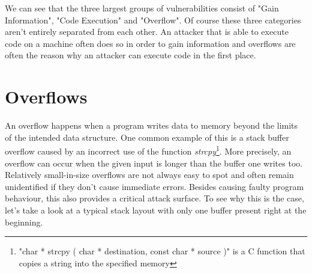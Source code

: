 \documentclass[10pt,twocolumn,a4paper]{article}
\begin{document}
We can see that the three largest groups of vulnerabilities consist of "Gain Information", "Code Execution" and "Overflow".
Of course these three categories aren't entirely separated from each other.
An attacker that is able to execute code on a machine often does so in order to gain information and overflows are often the reason why an attacker can execute code in the first place.
\section{Overflows}\label{sec:Overflows}
An overflow happens when a program writes data to memory beyond the limits of the intended data structure.
One common example of this is a stack buffer overflow caused by an incorrect use of the function \emph{strcpy}\footnote{"char * strcpy ( char * destination, const char * source )" is a C function that copies a string into the specified memory}.
More precisely, an overflow can occur when the given input is longer than the buffer one writes too.
Relatively small-in-size overflows are not always easy to spot and often remain unidentified if they don't cause immediate errors.
Besides causing faulty program behaviour, this also provides a critical attack surface.
To see why this is the case, let's take a look at a typical stack layout with only one buffer present right at the beginning.
\end{document}
